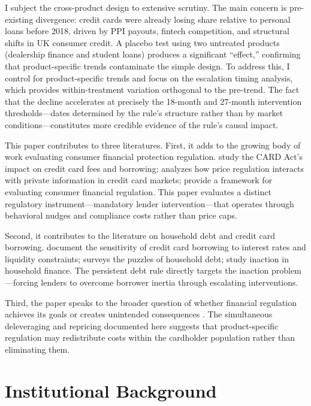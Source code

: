 \documentclass[12pt]{article}
\begin{document}
I subject the cross-product design to extensive scrutiny. The main concern is pre-existing divergence: credit cards were already losing share relative to personal loans before 2018, driven by PPI payouts, fintech competition, and structural shifts in UK consumer credit. A placebo test using two untreated products (dealership finance and student loans) produces a significant ``effect,'' confirming that product-specific trends contaminate the simple design. To address this, I control for product-specific trends and focus on the escalation timing analysis, which provides within-treatment variation orthogonal to the pre-trend. The fact that the decline accelerates at precisely the 18-month and 27-month intervention thresholds---dates determined by the rule's structure rather than by market conditions---constitutes more credible evidence of the rule's causal impact.

This paper contributes to three literatures. First, it adds to the growing body of work evaluating consumer financial protection regulation. \citet{agarwal2015} study the CARD Act's impact on credit card fees and borrowing; \citet{nelson2022} analyzes how price regulation interacts with private information in credit card markets; \citet{campbell2011} provide a framework for evaluating consumer financial regulation. This paper evaluates a distinct regulatory instrument---mandatory lender intervention---that operates through behavioral nudges and compliance costs rather than price caps.

Second, it contributes to the literature on household debt and credit card borrowing. \citet{gross2002} document the sensitivity of credit card borrowing to interest rates and liquidity constraints; \citet{zinman2015} surveys the puzzles of household debt; \citet{andersen2023} study inaction in household finance. The persistent debt rule directly targets the inaction problem---forcing lenders to overcome borrower inertia through escalating interventions.

Third, the paper speaks to the broader question of whether financial regulation achieves its goals or creates unintended consequences \citep{keys2010}. The simultaneous deleveraging and repricing documented here suggests that product-specific regulation may redistribute costs within the cardholder population rather than eliminating them.

\section{Institutional Background}
\end{document}
